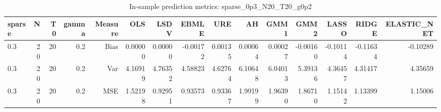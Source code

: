 \begin{table}[!htbp]\centering
\caption{In-sample prediction metrics: sparse_0p3_N20_T20_g0p2}
\label{tab:table2_sparse_0p3_N20_T20_g0p2}
\begin{tabular}{lrrrrrrrrrrrrrr}
\hline
sparse & N & T0 & gamma & Measure & OLS & LSDV & EBMLE & URE & AH & GMM1 & GMM2 & LASSO & RIDGE & ELASTIC_NET \\
\hline
0.3 & 20 & 20 & 0.2 & Bias & 0.00000 & 0.00000 & -0.00172 & 0.00135 & 0.00064 & 0.00027 & -0.00160 & -0.10114 & -0.11634 & -0.10289 \\
0.3 & 20 & 20 & 0.2 & Var & 4.16919 & 4.76352 & 4.58823 & 4.62764 & 6.10648 & 6.04013 & 5.39136 & 4.36457 & 4.31417 & 4.35659 \\
0.3 & 20 & 20 & 0.2 & MSE & 1.52198 & 0.92951 & 0.93573 & 0.93367 & 1.99199 & 1.96390 & 1.86710 & 1.15142 & 1.13399 & 1.15006 \\
\hline
\end{tabular}
\end{table}

